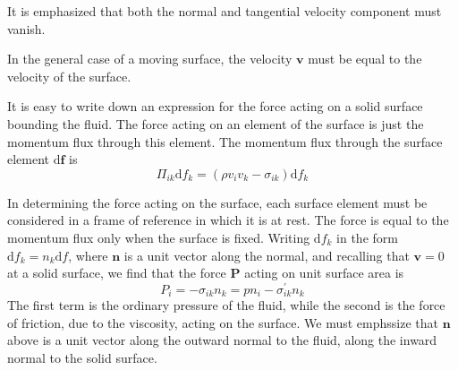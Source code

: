 \documentclass[conference]{IEEEtran}
\theoremstyle{definition}
\theoremstyle{remark}
\begin{document}
    It is emphasized that both the normal and tangential velocity component must vanish.

    In the general case of a moving surface, the velocity $\mathbf{v}$ must be equal to the velocity of the surface.

    It is easy to write down an expression for the force acting on a solid surface bounding the fluid. The force acting on an element of the surface is just the momentum flux through this element. The momentum flux through the surface element $\mathrm{d} \mathbf{f}$ is
    \[
        \Pi_{ik} \mathrm{d} f_k = (\rho v_i v_k - \sigma_{ik}) \mathrm{d} f_k
    \]

    In determining the force acting on the surface, each surface element must be considered in a frame of reference in which it is at rest. The force is equal to the momentum flux only when the surface is fixed. Writing $\mathrm{d} f_k$ in the form $\mathrm{d} f_k = n_k \mathrm{d} f$, where $\mathbf{n}$ is a unit vector along the normal, and recalling that $\mathbf{v} = 0$ at a solid surface, we find that the force $\mathbf{P}$ acting on unit surface area is
    \begin{equation}
        P_i = -\sigma_{ik} n_k = p n_i - \sigma^\prime_{ik} n_k
    \end{equation}
    The first term is the ordinary pressure of the fluid, while the second is the force of friction, due to the viscosity, acting on the surface. We must emphssize that $\mathbf{n}$ above is a unit vector along the outward normal to the fluid, along the inward normal to the solid surface.
\end{document}
